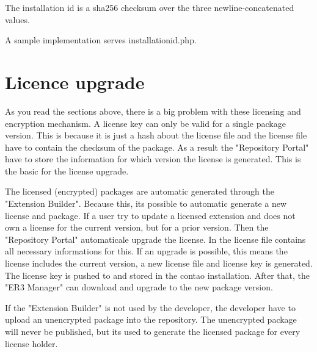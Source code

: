 The installation id is a sha256 checksum over the three newline-concatenated values.

A sample implementation serves installationid.php.

\section[sec:license upgrade]{Licence upgrade}

As you read the sections above, there is a big problem with these licensing and encryption mechanism.
A license key can only be valid for a single package version.
This is because it is just a hash about the license file and the license file have to contain the checksum of the package.
As a result the "Repository Portal" have to store the information for which version the license is generated.
This is the basic for the license upgrade.

The licensed (encrypted) packages are automatic generated through the "Extension Builder".
Because this, its possible to automatic generate a new license and package.
If a user try to update a licensed extension and does not own a license for the current version, but for a prior version.
Then the "Repository Portal" automaticale upgrade the license.
In the license file contains all necessary informations for this.
If an upgrade is possible, this means the license includes the current version, a new license file and license key is generated.
The license key is pushed to and stored in the contao installation.
After that, the "ER3 Manager" can download and upgrade to the new package version.

If the "Extension Builder" is not used by the developer, the developer have to upload an unencrypted package into the repository. The unencrypted package will never be published, but its used to generate the licensed package for every license holder.